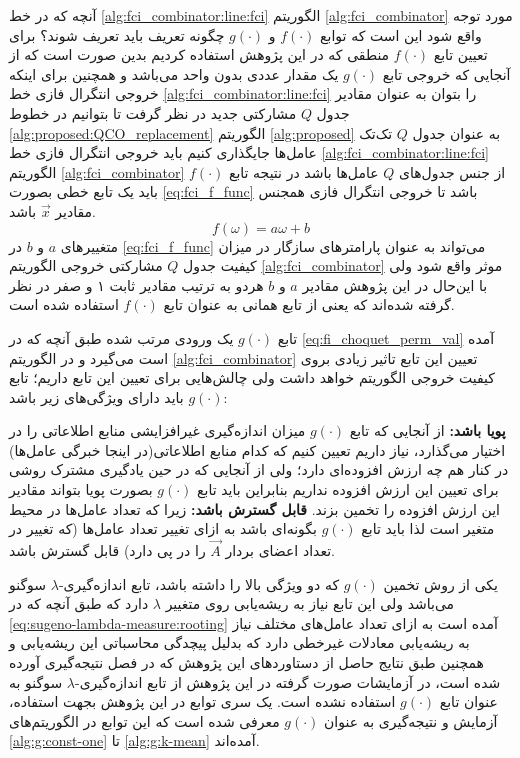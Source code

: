 آنچه که در خط \ref{alg:fci_combinator:line:fci} الگوریتم \ref{alg:fci_combinator} مورد توجه واقع شود این است که توابع $f(\cdot)$ و $g(\cdot)$ چگونه تعریف باید تعریف شوند؟ برای تعیین تابع $f(\cdot)$ منطقی که در این پژوهش استفاده کردیم بدین صورت است که از آنجایی که خروجی تابع $g(\cdot)$   یک مقدار عددی بدون واحد می‌باشد و همچنین برای اینکه خروجی انتگرال فازی خط \ref{alg:fci_combinator:line:fci} را بتوان به عنوان مقادیر جدول $Q$ مشارکتی جدید در نظر گرفت تا بتوانیم در خطوط \ref{alg:proposed:QCO_replacement} الگوریتم \ref{alg:proposed} به عنوان جدول $Q$ تک‌تک عامل‌ها جایگذاری کنیم باید خروجی انتگرال فازی خط \ref{alg:fci_combinator:line:fci} الگوریتم \ref{alg:fci_combinator} از جنس جدول‌های $Q$ عامل‌ها باشد در نتیجه تابع $f(\cdot)$ باید یک تابع خطی بصورت \ref{eq:fci_f_func} باشد تا خروجی انتگرال فازی همجنس مقادیر $\vec{x}$ باشد.
\begin{equation}\label{eq:fci_f_func}
f(\omega) = a\omega + b
\end{equation}
متغییر‌های $a$ و $b$ در \ref{eq:fci_f_func} می‌تواند به عنوان پارامترهای سازگار در میزان کیفیت جدول $Q$ مشارکتی خروجی الگوریتم \ref{alg:fci_combinator} موثر واقع شود ولی با این‌حال در این پژوهش مقادیر $a$ و $b$ هردو به ترتیب مقادیر ثابت ۱ و صفر در نظر گرفته شده‌اند که یعنی از تابع همانی به عنوان تابع $f(\cdot)$ استفاده شده است.

تابع $g(\cdot)$ یک ورودی مرتب شده طبق آنچه که در \ref{eq:fi_choquet_perm_val} آمده است می‌گیرد و در الگوریتم \ref{alg:fci_combinator} تعیین این تابع تاثیر زیادی بروی کیفیت خروجی الگوریتم خواهد داشت ولی چالش‌هایی برای تعیین این تابع داریم؛ تابع $g(\cdot)$ باید دارای ویژگی‌های زیر باشد:
\begin{enumerate}
 \textbf{پویا باشد:} از آنجایی که تابع $g(\cdot)$ میزان اندازه‌گیری غیرافزایشی منابع اطلاعاتی را در اختیار می‌گذارد، نیاز داریم تعیین کنیم که کدام منابع اطلاعاتی(در اینجا خبرگی عامل‌ها) در کنار هم چه ارزش افزوده‌ای دارد؛ ولی از آنجایی که در حین یادگیری مشترک روشی برای تعیین این ارزش افزوده نداریم بنابراین باید تابع $g(\cdot)$ بصورت پویا بتواند مقادیر این ارزش افزوده را تخمین بزند.
 \textbf{قابل گسترش  باشد:} زیرا که تعداد عامل‌ها در محیط متغیر است لذا باید تابع $g(\cdot)$ بگونه‌ای باشد به ازای تغییر تعداد عامل‌ها (که تغییر در تعداد اعضای بردار $\vec{A}$ را در پی دارد) قابل گسترش باشد.
\end{enumerate}
 یکی از روش‌ تخمین $g(\cdot)$ که دو ویژگی بالا را داشته باشد، تابع اندازه‌گیری-$\lambda$ سوگنو می‌باشد ولی این تابع نیاز به ریشه‌یابی روی متغییر $\lambda$ دارد که طبق آنچه که در \ref{eq:sugeno-lambda-measure:rooting} آمده است به ازای تعداد عامل‌های مختلف نیاز به ریشه‌یابی معادلات غیرخطی دارد که بدلیل پیچدگی محاسباتی این ریشه‌‌یابی و همچنین طبق نتایج حاصل از دستاوردهای این پژوهش که در فصل نتیجه‌گیری آورده شده است، در آزمایشات صورت گرفته در این پژوهش از تابع اندازه‌گیری-$\lambda$ سوگنو به عنوان تابع $g(\cdot)$ استفاده نشده است. یک سری توابع در این پژوهش بجهت استفاده، آزمایش و نتیجه‌گیری به عنوان $g(\cdot)$ معرفی شده است که این توابع در الگوریتم‌های \ref{alg:g:const-one} تا \ref{alg:g:k-mean} آمده‌اند.

